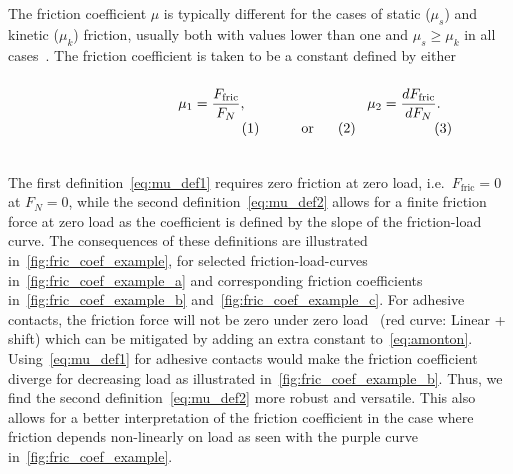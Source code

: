 The friction coefficient $\mu$ is typically different for the cases of static
($\mu_s$) and kinetic ($\mu_k$) friction, usually both with values lower than
one and $\mu_s \ge \mu_k$ in all cases~\cite[p. 6]{gnecco_meyer_2015}. The friction coefficient is taken to be a constant defined by either~\cite{gao_frictional_2004} \\
\vspace{0.1cm}
\begin{subequations}
\noindent\begin{minipage}{.2\linewidth}
  \hfill
\end{minipage}
\begin{minipage}[b]{0.2\linewidth}
  \begin{align}
    \mu_1 = \frac{F_{\text{fric}}}{F_N},
    \label{eq:mu_def1}
  \end{align}
\end{minipage}
\begin{minipage}[b]{0.2\linewidth}
  \begin{align*}
    \text{or}
  \end{align*}
\end{minipage}
\begin{minipage}[b]{0.2\linewidth}
  \begin{align}
    \mu_2 = \frac{dF_{\text{fric}}}{dF_N}.
    \label{eq:mu_def2}
  \end{align}
\end{minipage}
\begin{minipage}{.2\linewidth}
\end{minipage}
\label{eq:mu_def}
\end{subequations}
\vspace{0.1cm}
\\
\noindent The first definition~\cref{eq:mu_def1} requires zero friction at zero
load, i.e.\ $F_{\text{fric}} = 0$ at $F_N = 0$, while the second definition~\cref{eq:mu_def2} allows for a finite friction force at zero load as the
coefficient is defined by the slope of the friction-load curve. The
consequences of these definitions are illustrated in~\cref{fig:fric_coef_example}, for selected friction-load-curves in~\cref{fig:fric_coef_example_a} and corresponding friction coefficients in~\cref{fig:fric_coef_example_b} and~\cref{fig:fric_coef_example_c}. For adhesive
contacts, the friction force will not be zero under zero load~\cite{gao_frictional_2004} (red curve: Linear
+ shift) which can be mitigated by adding an extra constant to~\cref{eq:amonton}. Using~\cref{eq:mu_def1} for adhesive contacts would make the friction coefficient diverge for decreasing load as illustrated in~\cref{fig:fric_coef_example_b}. Thus, we find the second
definition~\cref{eq:mu_def2} more robust and versatile. This also allows for a better interpretation of the friction coefficient in the case where
friction depends non-linearly on load as seen with the purple curve in~\cref{fig:fric_coef_example}. 


